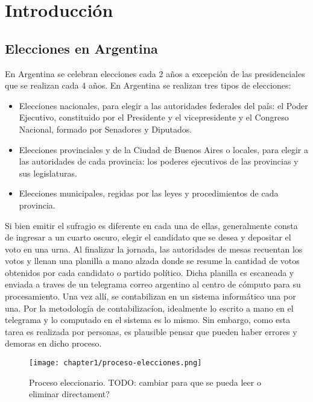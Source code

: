 \chapter{Introducci\'on}

\label{Chapter1}

\section{Elecciones en Argentina}

En Argentina se celebran elecciones cada 2 a\~{n}os a excepci\'on de las presidenciales que se realizan cada 4
a\~{n}os. En Argentina se realizan tres tipos de elecciones:

\begin{itemize}
    \item Elecciones nacionales, para elegir a las autoridades federales del país: el Poder Ejecutivo, constituido por el
          Presidente y el vicepresidente y el Congreso Nacional, formado por Senadores y Diputados.
    \item Elecciones provinciales y de la Ciudad de Buenos Aires o locales, para elegir a las autoridades de cada provincia: los
          poderes ejecutivos de las provincias y sus legislaturas.
    \item Elecciones municipales, regidas por las leyes y procedimientos de cada provincia.
\end{itemize}

Si bien emitir el sufragio es diferente en cada una de ellas, generalmente consta de ingresar a un cuarto oscuro,
elegir el candidato que se desea y depositar el voto en una urna. Al finalizar la jornada, las autoridades de mesas
recuentan los votos y llenan una planilla a mano alzada donde se resume la cantidad de votos obtenidos por cada
candidato o partido pol\'itico. Dicha planilla es escaneada y enviada a traves de un telegrama correo argentino al
centro de c\'omputo para su procesamiento. Una vez all\'i, se contabilizan en un sistema inform\'atico una por una. Por
la metodolog\'ia de contabilizac\'ion, idealmente lo escrito a mano en el telegrama y lo computado en el sistema es lo
mismo. Sin embargo, como esta tarea es realizada por personas, es plausible pensar que pueden haber errores y demoras
en dicho proceso.

\begin{figure}[H]
    \centering
    \texttt{[image: chapter1/proceso-elecciones.png]}
    \caption{Proceso eleccionario. TODO: cambiar para que se pueda leer o eliminar directament?}
    \label{fig:proceso-elecciones}
\end{figure}

